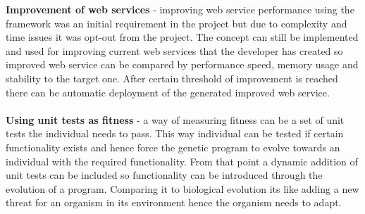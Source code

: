 \textbf{Improvement of web services} - improving web service performance using the framework was an initial requirement
in the project but due to complexity and time issues it was opt-out from the project. The concept can still be implemented
and used for improving current web services that the developer has created so improved web service can be compared by performance
speed, memory usage and stability to the target one. After certain threshold of improvement is reached there can be automatic deployment
of the generated improved web service.
\paragraph{}
\textbf{Using unit tests as fitness} - a way of measuring fitness can be a set of unit tests the individual needs to pass. This way
individual can be tested if certain functionality exists and hence force the genetic program to evolve towards an individual with
the required functionality. From that point a dynamic addition of unit tests can be included so functionality can be introduced through
the evolution of a program. Comparing it to biological evolution its like adding a new threat for an organism in its environment hence
the organism needs to adapt.


